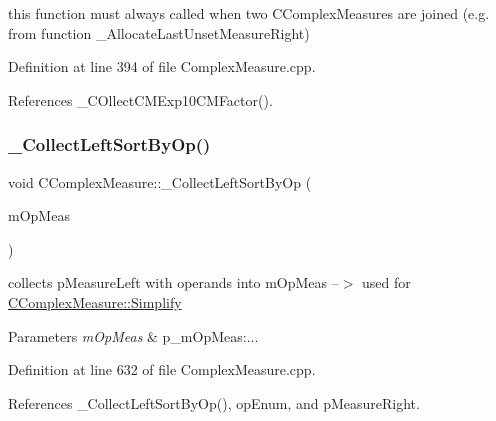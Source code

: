 this function must always called when two C\+Complex\+Measures are joined (e.\+g. from function \+\_\+\+Allocate\+Last\+Unset\+Measure\+Right) 



Definition at line 394 of file Complex\+Measure.\+cpp.



References \+\_\+\+C\+Ollect\+C\+M\+Exp10\+C\+M\+Factor().

\mbox{\label{classCComplexMeasure_ad2602b97f17c475a91454bf6bd1be1a4}} 
\subsubsection{\texorpdfstring{\+\_\+\+Collect\+Left\+Sort\+By\+Op()}{\_CollectLeftSortByOp()}}
{\footnotesize\ttfamily void C\+Complex\+Measure\+::\+\_\+\+Collect\+Left\+Sort\+By\+Op (\begin{DoxyParamCaption}\item[{map$<$ \hyperlink{MeasureOperator_8h_a1431c79e3ad4b4c5bcc9f31f188538f2}{e\+Operation}, \hyperlink{classCComplexMeasure}{C\+Complex\+Measure} $\ast$$>$ \&}]{m\+Op\+Meas }\end{DoxyParamCaption})\hspace{0.3cm}{\ttfamily [protected]}}



collects p\+Measure\+Left with operands into m\+Op\+Meas --$>$ used for \hyperlink{classCComplexMeasure_addb4e69033f2c32fb3bf4a3aef5e1470}{C\+Complex\+Measure\+::\+Simplify} 


\begin{DoxyParams}{Parameters}
{\em m\+Op\+Meas} & p\+\_\+m\+Op\+Meas\+:... \\
\hline
\end{DoxyParams}


Definition at line 632 of file Complex\+Measure.\+cpp.



References \+\_\+\+Collect\+Left\+Sort\+By\+Op(), op\+Enum, and p\+Measure\+Right.

\mbox{\label{classCComplexMeasure_aed6efc43efe99d8cf1072ac98ec8d21c}} 

